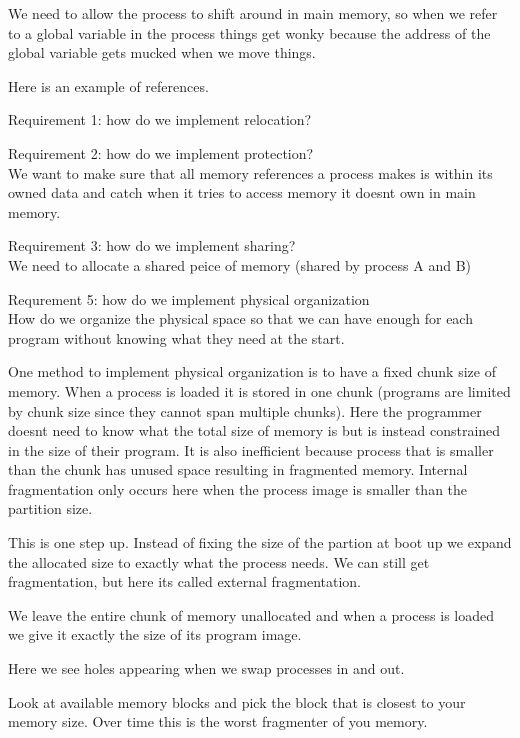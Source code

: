 \documentclass{article}
\begin{document}



We need to allow the process to shift around in main memory, so when we refer to a global variable in the process things get wonky because the address of the global variable gets mucked when we move things.

Here is an example of references.

Requirement 1: how do we implement relocation?

Requirement 2: how do we implement protection?\\
We want to make sure that all memory references a process makes is within its owned data and catch when it tries to access memory it doesnt own in main memory.

Requirement 3: how do we implement sharing?\\
We need to allocate a shared peice of memory (shared by process A and B)


Requrement 5: how do we implement physical organization\\
How do we organize the physical space so that we can have enough for each program without knowing what they need at the start.

One method to implement physical organization is to have a fixed chunk size of memory. When a process is loaded it is stored in one chunk (programs are limited by chunk size since they cannot span multiple chunks). Here the programmer doesnt need to know what the total size of memory is but is instead constrained in the size of their program. It is also inefficient because process that is smaller than the chunk has unused space resulting in fragmented memory. Internal fragmentation only occurs here when the process image is smaller than the partition size.






This is one step up. Instead of fixing the size of the partion at boot up we expand the allocated size to exactly what the process needs. We can still get fragmentation, but here its called external fragmentation.

We leave the entire chunk of memory unallocated and when a process is loaded we give it exactly the size of its program image.

Here we see holes appearing when we swap processes in and out.

Look at available memory blocks and pick the block that is closest to your memory size. Over time this is the worst fragmenter of you memory.

\end{document}
